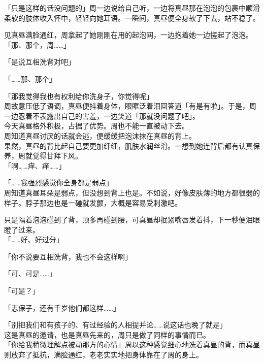 「只是这样的话没问题的」周一边说给自己听，一边将真昼那在泡泡的包裹中顺滑柔软的肢体收入怀中，轻轻向她耳语。一瞬间，真昼便全身软了下去，站不稳了。

见真昼满脸通红，周拿起了她刚刚在用的起泡网，一边抱着她一边搓起了泡泡。\\

「那、那个，周……」

「是说互相洗背对吧」

「……那、那个」

「那我觉得我也有权利给你洗身子，你觉得呢」\\

周故意压低了语调，真昼便抖着身体，眼眶泛着泪回答道「有是有啦」。于是，周一边忍着不表露出自己的害羞，一边笑道「那就没问题了吧」。\\

今天真昼格外积极，占据了优势。周也不能一直被动下去。\\

周知道真昼讨厌的话就会逃，便缓缓把泡沫抹在真昼的背上。\\

果然，真昼的背比起自己要更加纤细，肌肤水润丝滑。一想到她连背后都有认真保养，周就觉得甘拜下风。\\

「啊……痒、痒……」

「……我强烈感觉你全身都是弱点」\\

周知道真昼耳朵是弱点，但没想到背上也是。不如说，好像皮肤薄的地方都很弱的样子。脖子那边也是一碰就发颤，大概是容易受刺激吧。

只是隔着泡泡碰到了背，顶多再碰到腰，可真昼却抿紧嘴唇发着抖，下一秒便泪眼瞪了过来。\\

「……好、好过分」

「你不说要互相洗背，我也不会这样啊」

「可、可是……」

「可是？」

「志保子，还有千岁他们都这样……」

「别把我们和有孩子的、有过经验的人相提并论……说这话也晚了就是」\\

这是真昼的邀请，也是真昼先来的，周只是做了同样的事情而已。\\

「你给我稍微理解点被动那方的心情」周以这种感觉细心地洗着真昼的背，而真昼则放弃了抵抗，满脸通红，老老实实地把身体靠在了周的身上。
